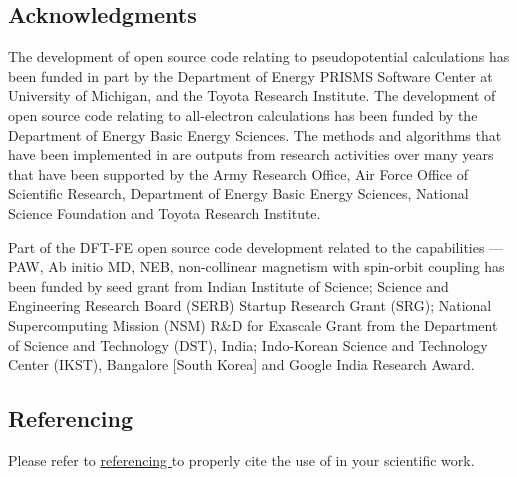 \subsection{Acknowledgments}
The development of \dftfe{} open source code relating to pseudopotential calculations has been funded in part by the Department 
of Energy PRISMS Software Center at University of Michigan, and the Toyota Research Institute. The development of \dftfe{} open 
source code relating to all-electron calculations has been funded by the Department of Energy Basic Energy Sciences. The methods 
and algorithms that have been implemented in \dftfe{} are outputs from research activities over many years that have been 
supported by the Army Research Office, Air Force Office of Scientific Research, Department of Energy Basic Energy Sciences, 
National Science Foundation and Toyota Research Institute. 

Part of the DFT-FE open source code development related to the capabilities --- PAW, Ab initio MD, NEB, non-collinear magnetism with spin-orbit coupling has been funded by seed grant from Indian Institute of Science; Science and Engineering Research Board (SERB) Startup Research Grant (SRG); National Supercomputing Mission (NSM) R\&D for Exascale Grant from the Department of Science and Technology (DST), India; Indo-Korean Science and Technology Center (IKST), Bangalore [South Korea] and Google India Research Award.

\subsection{Referencing \dftfe{}}
Please refer to \href{https://sites.google.com/umich.edu/dftfe/referencing}{referencing  \dftfe{}} to properly cite the use of 
\dftfe{} in your scientific work. 
